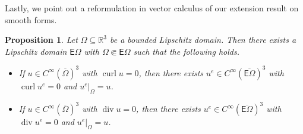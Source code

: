 \documentclass[10pt,a4paper]{amsart}
\newtheorem{proposition}[theorem]{Proposition}
\theoremstyle{definition}
\theoremstyle{remark}
\numberwithin{equation}{section}
\newcommand{\bbR}{{\mathbb R}}
\newcommand{\sfE}{{\mathsf E}}
\newcommand{\closure}{\overline}
\renewcommand{\restriction}{|}
\newcommand{\Domain}{{\Omega}}
\newcommand{\extDomain}{{\sfE\Omega}}
\newcommand{\curl}{\operatorname{curl}}
\newcommand{\divergence}{\operatorname{div}}
\begin{document}
Lastly, we point out a reformulation in vector calculus of our extension result on smooth forms.

\begin{proposition}
    Let $\Domain \subseteq \bbR^{3}$ be a bounded Lipschitz domain.
    Then there exists a Lipschitz domain $\extDomain$ with $\Domain \Subset \extDomain$ such that the following holds.
    \begin{itemize}
        \item 
        If $u \in C^{\infty}(\closure\Domain)^{3}$ with $\curl u = 0$, 
        then there exists $u^{e} \in C^{\infty}(\closure\extDomain)^{3}$ with $\curl u^{e} = 0$ and $u^{e} \restriction_{\Domain} = u$.
        \item 
        If $u \in C^{\infty}(\closure\Domain)^{3}$ with $\divergence u = 0$, 
        then there exists $u^{e} \in C^{\infty}(\closure\extDomain)^{3}$ with $\divergence u^{e} = 0$ and $u^{e} \restriction_{\Domain} = u$.
    \end{itemize}
\end{proposition}
\end{document}
